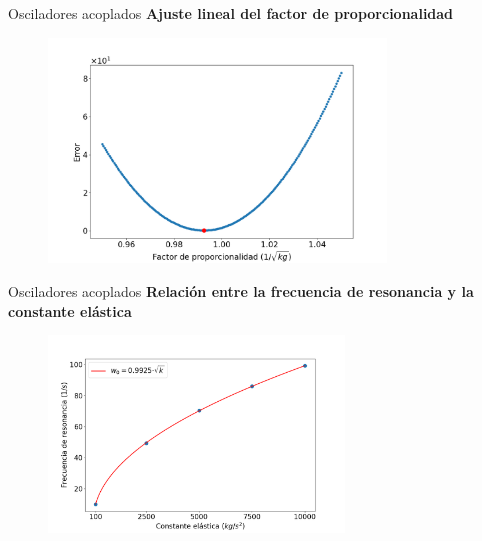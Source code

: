 \begin{frame}{Osciladores acoplados}
    \textbf{Ajuste lineal del factor de proporcionalidad}
    \begin{minipage}[c]{0.8\linewidth}
        \begin{figure}[H]
            \centering
            \includegraphics[width=0.8\textwidth]{pic/05-results/prop_error}
            \label{fig:prop-error}
        \end{figure}
    \end{minipage}
    \begin{minipage}{0.15\linewidth}
        \large{}
    \end{minipage}
\end{frame}

\begin{frame}{Osciladores acoplados}
    \textbf{Relación entre la frecuencia de resonancia y la constante elástica}
    \begin{figure}
        \centering
        \includegraphics[width=0.7\textwidth]{pic/05-results/prop_relation}
        \label{fig:prop-relation}
    \end{figure}
\end{frame}